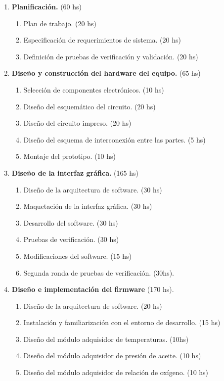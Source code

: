 \documentclass[11pt]{charter}
\begin{document}
\begin{enumerate}
\item \textbf{Planificación.} (60 hs)
	\begin{enumerate}
	\item Plan de trabajo. (20 hs)
	\item Especificación de requerimientos de sistema. (20 hs)
	\item Definición de pruebas de verificación y validación. (20 hs)
	\end{enumerate}
\item \textbf{Diseño y construcción del hardware del equipo.} (65 hs)
	\begin{enumerate}
	\item Selección de componentes electrónicos. (10 hs)
	\item Diseño del esquemático del circuito. (20 hs)
	\item Diseño del circuito impreso. (20 hs)
	\item Diseño del esquema de interconexión entre las partes. (5 hs)
	\item Montaje del prototipo. (10 hs)
	\end{enumerate}
\item \textbf{Diseño de la interfaz gráfica.} (165 hs)
	\begin{enumerate}
	\item Diseño de la arquitectura de software. (30 hs)
	\item Maquetación de la interfaz gráfica. (30 hs)
	\item Desarrollo del software. (30 hs)
	\item Pruebas de verificación. (30 hs)
	\item Modificaciones del software. (15 hs)
	\item Segunda ronda de pruebas de verificación. (30hs).
	\end{enumerate}
\item \textbf{Diseño e implementación del firmware} (170 hs).
	\begin{enumerate}
	\item Diseño de la arquitectura de software. (20 hs)
	\item Instalación y familiarización con el entorno de desarrollo. (15 hs)
	\item Diseño del módulo adquisidor de temperaturas. (10hs)
	\item Diseño del módulo adquisidor de presión de aceite. (10 hs)
	\item Diseño del módulo adquisidor de relación de oxígeno. (10 hs)

\end{enumerate}
\end{enumerate}
\end{document}
